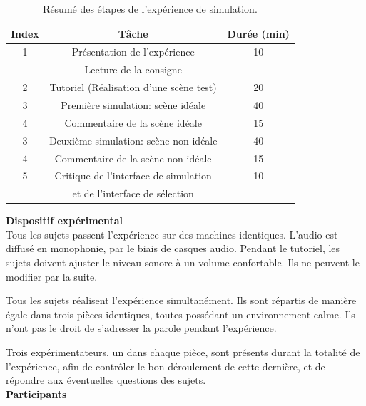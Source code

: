 \begin{table}[t]
\centering
\begin{tabular}{c c c} 
Index          & Tâche                               & Durée (min) \\                      
\hline
1 & Présentation de l'expérience                     & 10 \\
  & Lecture de la consigne                           &  \\
\hline
2 & Tutoriel (Réalisation d'une scène test)          & 20 \\
\hline
3 & Première simulation: scène idéale                & 40 \\
\hline
4 & Commentaire de la scène idéale                   & 15 \\
\hline
3 & Deuxième simulation: scène non-idéale            & 40  \\
\hline
4 & Commentaire de la scène non-idéale               & 15 \\
\hline
5 & Critique de l'interface de simulation            & 10 \\
  & et de l'interface de sélection                   & \\
\hline
\end{tabular}
\vspace{0.5mm}
\caption{Résumé des étapes de l’expérience de simulation.}
\label{tab:indSimu}
\end{table}

{\setlength{\parindent}{0cm}\textbf{Dispositif expérimental}} \\

Tous les sujets passent l'expérience sur des machines identiques. L'audio est diffusé en monophonie, par le biais de casques audio. Pendant le tutoriel, les sujets doivent ajuster le niveau sonore à un volume confortable. Ils ne peuvent le modifier par la suite.

Tous les sujets réalisent l'expérience simultanément. Ils sont répartis de manière égale dans trois pièces identiques, toutes possédant un environnement calme. Ils n'ont pas le droit de s'adresser la parole pendant l'expérience.

Trois expérimentateurs, un dans chaque pièce, sont présents durant la totalité de l'expérience, afin de contrôler le bon déroulement de cette dernière, et de répondre aux éventuelles questions des sujets.  \\

{\setlength{\parindent}{0cm}\textbf{Participants}} \\

